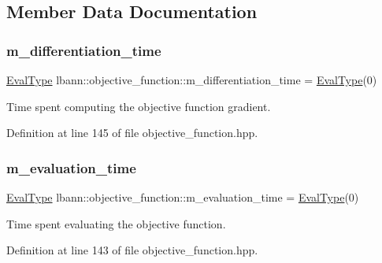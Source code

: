 \subsection{Member Data Documentation}
\mbox{\label{classlbann_1_1objective__function_ae526559f3a530f540a29407ea64bbea6}} 
\subsubsection{\texorpdfstring{m\+\_\+differentiation\+\_\+time}{m\_differentiation\_time}}
{\footnotesize\ttfamily \hyperlink{base_8hpp_a3266f5ac18504bbadea983c109566867}{Eval\+Type} lbann\+::objective\+\_\+function\+::m\+\_\+differentiation\+\_\+time = \hyperlink{base_8hpp_a3266f5ac18504bbadea983c109566867}{Eval\+Type}(0)\hspace{0.3cm}{\ttfamily [private]}}

Time spent computing the objective function gradient. 

Definition at line 145 of file objective\+\_\+function.\+hpp.

\mbox{\label{classlbann_1_1objective__function_a9ef17c7204cd371261c9c083d86de91a}} 
\subsubsection{\texorpdfstring{m\+\_\+evaluation\+\_\+time}{m\_evaluation\_time}}
{\footnotesize\ttfamily \hyperlink{base_8hpp_a3266f5ac18504bbadea983c109566867}{Eval\+Type} lbann\+::objective\+\_\+function\+::m\+\_\+evaluation\+\_\+time = \hyperlink{base_8hpp_a3266f5ac18504bbadea983c109566867}{Eval\+Type}(0)\hspace{0.3cm}{\ttfamily [private]}}

Time spent evaluating the objective function. 

Definition at line 143 of file objective\+\_\+function.\+hpp.

